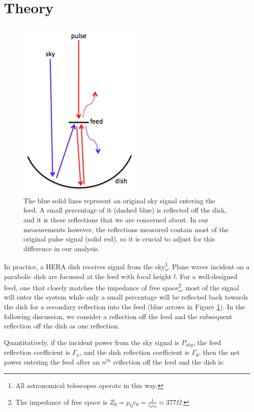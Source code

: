 \documentclass[12pt,preprint]{aastex}
\begin{document}
\section{Theory}{\label{sec:theory}}
\begin{figure}[ht!]
\centering
\includegraphics[totalheight=0.3\textheight]{plots/reflection_cartoon.png}
\caption{The blue solid lines represent an original sky signal entering the
feed. A small percentage of it (dashed blue) is reflected off the dish, and it
is these reflections that we are concerned about. In our measurements however,
the reflections measured contain most of the original pulse signal (solid red),
so it is crucial to adjust for this difference in our analysis.}
\label{fig:cartoon}
\end{figure}
In practice, a HERA dish receives signal from the sky\footnote{All astronomical
telescopes operate in this way.}.
 Plane waves incident on a parabolic dish
are focussed at the feed with focal height $l$. For a well-designed feed, one
that closely matches the impedance of free space\footnote{The impedance of free space
is $Z_{0} = \mu_{0}c_{0} = \frac{1}{\epsilon_{0}c_{0}} \approx 377\Omega $.},
most of the signal will enter the system while only
a small percentage will be reflected back towards the dish for a secondary
reflection into the feed (blue arrows in Figure \ref{fig:cartoon}). In the
following discussion, we consider a reflection off the feed and the
subsequent reflection off the dish as one reflection.

Quantitatively, if the incident power from the sky signal is $P_{sky}$, the feed
reflection coefficient is $\Gamma_{a}$, and the dish reflection
coefficient is $\Gamma_{d}$, then the net power entering the feed after an
$n^{th}$ reflection off the feed and the dish is:
\end{document}
